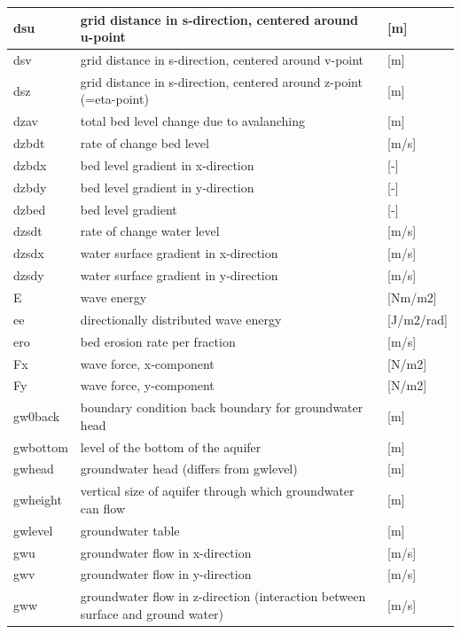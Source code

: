\documentclass{article}
\begin{document}
\begin{tabular}{|p{0.7in}|p{2.5in}|p{0.9in}|}
dsu & grid distance in s-direction, centered around u-point          & [m] \\ \hline 
dsv & grid distance in s-direction, centered around v-point          & [m] \\ \hline 
dsz & grid distance in s-direction, centered around z-point (=eta-point)         & [m] \\ \hline 
dzav & total bed level change due to avalanching          & [m] \\ \hline 
dzbdt & rate of change bed level            & [m/s] \\ \hline 
dzbdx & bed level gradient in x-direction            & [-] \\ \hline 
dzbdy & bed level gradient in y-direction            & [-] \\ \hline 
dzbed & bed level gradient               & [-] \\ \hline 
dzsdt & rate of change water level            & [m/s] \\ \hline 
dzsdx & water surface gradient in x-direction            & [m/s] \\ \hline 
dzsdy & water surface gradient in y-direction            & [m/s] \\ \hline 
E & wave energy               & [Nm/m2] \\ \hline 
ee & directionally distributed wave energy             & [J/m2/rad] \\ \hline 
ero & bed erosion rate per fraction            & [m/s] \\ \hline 
Fx & wave force, x-component              & [N/m2] \\ \hline 
Fy & wave force, y-component              & [N/m2] \\ \hline 
gw0back & boundary condition back boundary for groundwater head          & [m] \\ \hline 
gwbottom & level of the bottom of the aquifer          & [m] \\ \hline 
gwhead & groundwater head (differs from gwlevel)            & [m] \\ \hline 
gwheight & vertical size of aquifer through which groundwater can flow        & [m] \\ \hline 
gwlevel & groundwater table  & [m] \\ \hline 
gwu & groundwater flow in x-direction             & [m/s] \\ \hline 
gwv & groundwater flow in y-direction             & [m/s] \\ \hline 
gww & groundwater flow in z-direction (interaction between surface and ground water)       & [m/s] \\ \hline 

\end{tabular}
\end{document}
